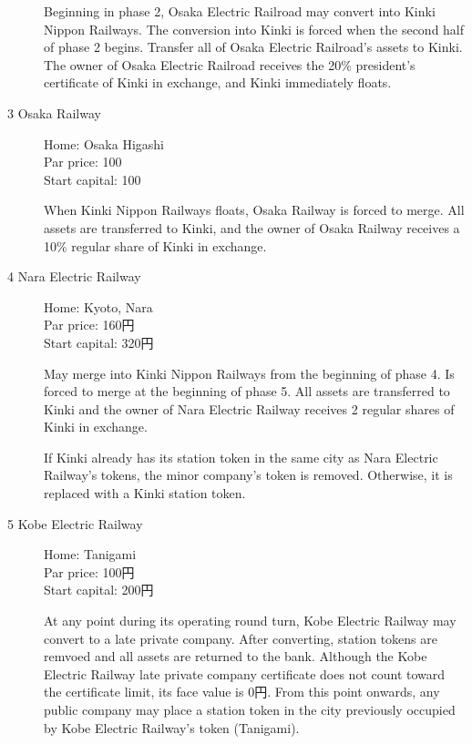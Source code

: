 \begin{multicols}{2}
\begin{description}
Beginning in phase 2, Osaka Electric Railroad may convert into Kinki
Nippon Railways. The conversion into Kinki is forced when the second
half of phase 2 begins. Transfer all of Osaka Electric Railroad's
assets to Kinki. The owner of Osaka Electric Railroad receives the
20\% president's certificate of Kinki in exchange, and Kinki
immediately floats.

\item[3 Osaka Railway] \hfill

Home: Osaka Higashi \\
Par price: 100 \\
Start capital: 100

When Kinki Nippon Railways floats, Osaka Railway is forced to
merge. All assets are transferred to Kinki, and the owner of Osaka
Railway receives a 10\% regular share of Kinki in exchange.

\item[4 Nara Electric Railway] \hfill

Home: Kyoto, Nara \\
Par price: 160円 \\
Start capital: 320円

May merge into Kinki Nippon Railways from the beginning of phase 4. Is
forced to merge at the beginning of phase 5. All assets are
transferred to Kinki and the owner of Nara Electric Railway receives 2
regular shares of Kinki in exchange.

If Kinki already has its station token in the same city as Nara
Electric Railway's tokens, the minor company's token is
removed. Otherwise, it is replaced with a Kinki station token.

\item[5 Kobe Electric Railway]\hfill

  Home: Tanigami \\
  Par price: 100円 \\
  Start capital: 200円

  At any point during its operating round turn, Kobe Electric Railway
  may convert to a late private company. After converting, station
  tokens are remvoed and all assets are returned to the bank. Although
  the Kobe Electric Railway late private company certificate does not
  count toward the certificate limit, its face value is 0円. From
  this point onwards, any public company may place a station token in
  the city previously occupied by Kobe Electric Railway's token
  (Tanigami).
\end{description}


\end{multicols}
